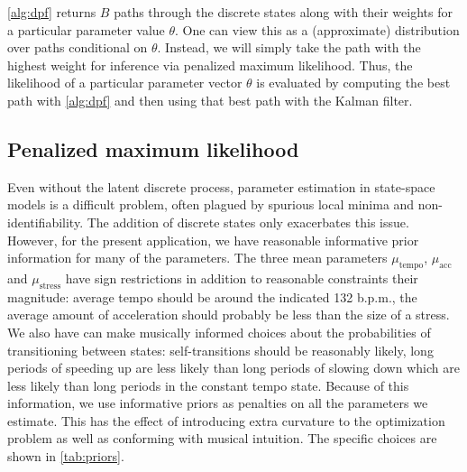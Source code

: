 \documentclass[aoas]{imsart}
\begin{document}
\autoref{alg:dpf} returns $B$ paths through the discrete states along with their weights for a 
particular parameter value $\theta$. One
can view this as a (approximate) distribution over paths conditional
on $\theta$. Instead, we will simply take the path with the highest
weight for inference via penalized maximum likelihood. Thus, the
likelihood of a particular parameter vector $\theta$ is evaluated by
computing the best path with \autoref{alg:dpf} and then using that best
path with the Kalman filter.%

\subsection{Penalized maximum likelihood}
\label{sec:penal-maxim-likel}

Even without the latent discrete process, parameter estimation in
state-space models is a difficult problem, often plagued by spurious
local minima and non-identifiability. The addition of discrete states
only exacerbates this issue. However, for the present application, we
have reasonable informative prior information for many of the
parameters. The three mean parameters $\mu_{\textrm{tempo}}$,
$\mu_{\textrm{acc}}$ and $\mu_{\textrm{stress}}$ have sign
restrictions in addition to reasonable constraints their magnitude:
average tempo should be around the indicated 132 b.p.m., the average
amount of acceleration should probably be less than the size of a
stress. We also have can make musically informed choices about the
probabilities of transitioning between states: self-transitions should
be reasonably likely, long periods of speeding up are less likely than
long periods of slowing down which are less likely than long periods
in the constant tempo state. Because of this information, we use
informative priors as penalties on all the parameters we
estimate. This has the effect of introducing extra curvature to the
optimization problem as well as conforming with musical intuition. The
specific choices are shown in \autoref{tab:priors}. 
\end{document}

